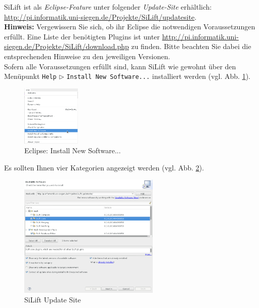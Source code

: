 \documentclass[a4paper]{scrartcl}
\begin{document}
SiLift ist als \textit{Eclipse-Feature} unter folgender \textit{Update-Site} erhältlich:\\ \url{http://pi.informatik.uni-siegen.de/Projekte/SiLift/updatesite}.\\


\textbf{Hinweis:} Vergewissern Sie sich, ob ihr Eclipse die notwendigen Voraussetzungen erfüllt. 
Eine Liste der benötigten Plugins ist unter \url{http://pi.informatik.uni-siegen.de/Projekte/SiLift/download.php} zu finden.
Bitte beachten Sie dabei die entsprechenden Hinweise zu den jeweiligen Versionen.\\


Sofern alle Voraussetzungen erfüllt sind, kann SiLift wie gewohnt über den Menüpunkt \texttt{Help} $\triangleright$ \texttt{Install New Software...} installiert werden (vgl. Abb. \ref{eclipse_install_new_software}).

\begin{figure}[H]
\centering
\includegraphics[width=0.25\textwidth]{graphics/eclipse-install_new_software.png}
\caption{Eclipse: Install New Software...}
\label{eclipse_install_new_software}
\end{figure}

Es sollten Ihnen vier Kategorien angezeigt werden (vgl. Abb. \ref{silift_update_site}). 

\begin{figure}[H]
\centering
\includegraphics[width=0.6\textwidth]{graphics/eclipse-install_silift.png}
\caption{SiLift Update Site}
\label{silift_update_site}
\end{figure}
\end{document}
